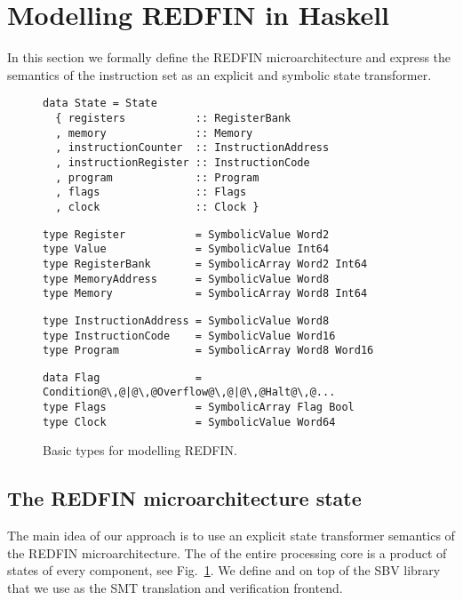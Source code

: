 \section{Modelling REDFIN in Haskell\label{sec-transformer}}
In this section we formally define the REDFIN microarchitecture and express the
semantics of the instruction set as an explicit and symbolic state transformer.

\begin{figure}[t]
\begin{verbatim}
data State = State
  { registers           :: RegisterBank
  , memory              :: Memory
  , instructionCounter  :: InstructionAddress
  , instructionRegister :: InstructionCode
  , program             :: Program
  , flags               :: Flags
  , clock               :: Clock }
\end{verbatim}
\begin{verbatim}
type Register           = SymbolicValue Word2
type Value              = SymbolicValue Int64
type RegisterBank       = SymbolicArray Word2 Int64
type MemoryAddress      = SymbolicValue Word8
type Memory             = SymbolicArray Word8 Int64
\end{verbatim}
\begin{verbatim}
type InstructionAddress = SymbolicValue Word8
type InstructionCode    = SymbolicValue Word16
type Program            = SymbolicArray Word8 Word16
\end{verbatim}
\begin{verbatim}
data Flag               = Condition@\,@|@\,@Overflow@\,@|@\,@Halt@\,@...
type Flags              = SymbolicArray Flag Bool
type Clock              = SymbolicValue Word64
\end{verbatim}
\caption{Basic types for modelling REDFIN.\label{fig-types}}
\end{figure}

\subsection{The REDFIN microarchitecture state}

The main idea of our approach is to use an explicit state transformer
semantics of the REDFIN microarchitecture. The  of the entire
processing core is a product of states of every component, see
Fig.~\ref{fig-types}.
We define  and  on top of the SBV
library~\cite{SBV} that we use as the SMT translation and verification frontend.


